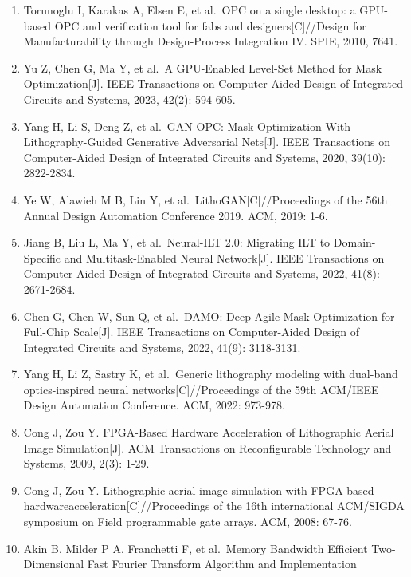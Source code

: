 \documentclass[
  preprint]{elsarticle}
\begin{document}
\begin{enumerate}
  Zheng X, Ma X, Zhao Q, et al.~Model-informed deep learning for
  computational lithography with partially coherent illumination{[}J{]}.
  Optics Express, 2020, 28(26): 39475-39491.
\item
  Torunoglu I, Karakas A, Elsen E, et al.~OPC on a single desktop: a
  GPU-based OPC and verification tool for fabs and
  designers{[}C{]}//Design for Manufacturability through Design-Process
  Integration IV. SPIE, 2010, 7641.
\item
  Yu Z, Chen G, Ma Y, et al.~A GPU-Enabled Level-Set Method for Mask
  Optimization{[}J{]}. IEEE Transactions on Computer-Aided Design of
  Integrated Circuits and Systems, 2023, 42(2): 594-605.
\item
  Yang H, Li S, Deng Z, et al.~GAN-OPC: Mask Optimization With
  Lithography-Guided Generative Adversarial Nets{[}J{]}. IEEE
  Transactions on Computer-Aided Design of Integrated Circuits and
  Systems, 2020, 39(10): 2822-2834.
\item
  Ye W, Alawieh M B, Lin Y, et al.~LithoGAN{[}C{]}//Proceedings of the
  56th Annual Design Automation Conference 2019. ACM, 2019: 1-6.
\item
  Jiang B, Liu L, Ma Y, et al.~Neural-ILT 2.0: Migrating ILT to
  Domain-Specific and Multitask-Enabled Neural Network{[}J{]}. IEEE
  Transactions on Computer-Aided Design of Integrated Circuits and
  Systems, 2022, 41(8): 2671-2684.
\item
  Chen G, Chen W, Sun Q, et al.~DAMO: Deep Agile Mask Optimization for
  Full-Chip Scale{[}J{]}. IEEE Transactions on Computer-Aided Design of
  Integrated Circuits and Systems, 2022, 41(9): 3118-3131.
\item
  Yang H, Li Z, Sastry K, et al.~Generic lithography modeling with
  dual-band optics-inspired neural networks{[}C{]}//Proceedings of the
  59th ACM/IEEE Design Automation Conference. ACM, 2022: 973-978.
\item
  Cong J, Zou Y. FPGA-Based Hardware Acceleration of Lithographic Aerial
  Image Simulation{[}J{]}. ACM Transactions on Reconfigurable Technology
  and Systems, 2009, 2(3): 1-29.
\item
  Cong J, Zou Y. Lithographic aerial image simulation with FPGA-based
  hardwareacceleration{[}C{]}//Proceedings of the 16th international
  ACM/SIGDA symposium on Field programmable gate arrays. ACM, 2008:
  67-76.
\item
  Akin B, Milder P A, Franchetti F, et al.~Memory Bandwidth Efficient
  Two-Dimensional Fast Fourier Transform Algorithm and Implementation

\end{enumerate}
\end{document}
